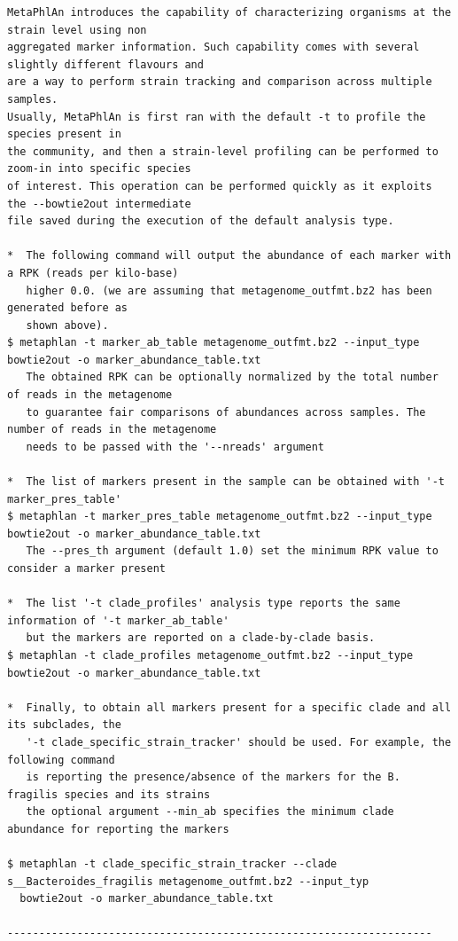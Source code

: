 \documentclass[
  letterpaper,
]{book}
\begin{document}
\begin{verbatim}
MetaPhlAn introduces the capability of characterizing organisms at the strain level using non
aggregated marker information. Such capability comes with several slightly different flavours and
are a way to perform strain tracking and comparison across multiple samples.
Usually, MetaPhlAn is first ran with the default -t to profile the species present in
the community, and then a strain-level profiling can be performed to zoom-in into specific species
of interest. This operation can be performed quickly as it exploits the --bowtie2out intermediate
file saved during the execution of the default analysis type.

*  The following command will output the abundance of each marker with a RPK (reads per kilo-base)
   higher 0.0. (we are assuming that metagenome_outfmt.bz2 has been generated before as
   shown above).
$ metaphlan -t marker_ab_table metagenome_outfmt.bz2 --input_type bowtie2out -o marker_abundance_table.txt
   The obtained RPK can be optionally normalized by the total number of reads in the metagenome
   to guarantee fair comparisons of abundances across samples. The number of reads in the metagenome
   needs to be passed with the '--nreads' argument

*  The list of markers present in the sample can be obtained with '-t marker_pres_table'
$ metaphlan -t marker_pres_table metagenome_outfmt.bz2 --input_type bowtie2out -o marker_abundance_table.txt
   The --pres_th argument (default 1.0) set the minimum RPK value to consider a marker present

*  The list '-t clade_profiles' analysis type reports the same information of '-t marker_ab_table'
   but the markers are reported on a clade-by-clade basis.
$ metaphlan -t clade_profiles metagenome_outfmt.bz2 --input_type bowtie2out -o marker_abundance_table.txt

*  Finally, to obtain all markers present for a specific clade and all its subclades, the
   '-t clade_specific_strain_tracker' should be used. For example, the following command
   is reporting the presence/absence of the markers for the B. fragilis species and its strains
   the optional argument --min_ab specifies the minimum clade abundance for reporting the markers

$ metaphlan -t clade_specific_strain_tracker --clade s__Bacteroides_fragilis metagenome_outfmt.bz2 --input_typ
  bowtie2out -o marker_abundance_table.txt

-------------------------------------------------------------------


\end{verbatim}
\end{document}
